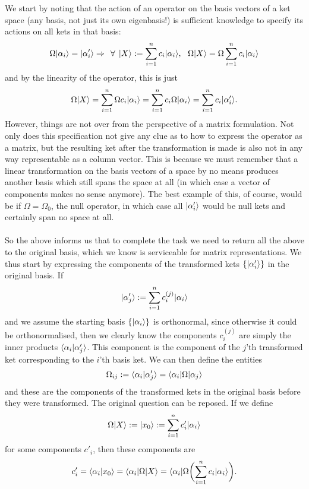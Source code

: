 \\\\
We start by noting that the action of an operator on the basis vectors of a ket space (any basis, not just its own eigenbasis!) is sufficient knowledge to specify its actions on all kets in that basis:
$$
\Omega|\alpha_{i}\rangle=|\alpha'_{i}\rangle\Rightarrow\:\: \forall \:\:|X\rangle:=\sum_{i=1}^{n}c_{i}|\alpha_{i}\rangle, \:\:\: \Omega|X\rangle=\Omega\sum_{i=1}^{n}c_{i}|\alpha_{i}\rangle
$$
and by the linearity of the operator, this is just 
$$
\Omega|X\rangle=\sum_{i=1}^{n}\Omega c_{i}|\alpha_{i}\rangle=\sum_{i=1}^{n} c_{i}\Omega|\alpha_{i}\rangle=\sum_{i=1}^{n}c_{i}|\alpha'_{i}\rangle.
$$
However, things are not over from the perspective of a matrix formulation. Not only does this specification not give any clue as to how to express the operator as a matrix, but the resulting ket after the transformation is made is also not in any way representable as a column vector. This is because we must remember that a linear transformation on the basis vectors of a space by no means produces another basis which still spans the space at all (in which case a vector of components makes no sense anymore). The best example of this, of course, would be if $\Omega=\Omega_{0}$, the null operator, in which case all $|\alpha'_{i}\rangle$ would be null kets and certainly span no space at all.
\\\\
So the above informs us that to complete the task we need to return all the above to the original basis, which we know is serviceable for matrix representations. We thus start by expressing the components of the transformed kets $\{|\alpha'_{i}\rangle\}$ in the original basis. If
$$
|\alpha'_{j}\rangle:=\sum_{i=1}^{n}c^{(j)}_{i}|\alpha_{i}\rangle
$$
and we assume the starting basis $\{|\alpha_{i}\rangle\}$ is orthonormal, since otherwise it could be orthonormalised, then we clearly know the components $c_{i}^{(j)}$ are simply the inner products $\langle\alpha_{i}|\alpha'_{j}\rangle$. This component is the component of the $j$'th transformed ket corresponding to the $i$'th basis ket. We can then define the entities
$$
\Omega_{ij}:=\langle\alpha_{i}|\alpha'_{j}\rangle=\langle\alpha_{i}|{\Omega}|\alpha_{j}\rangle
$$
and these are the components of the transformed kets in the original basis before they were transformed. The original question can be reposed. If we define 
$$
\Omega|X\rangle:=|x_{0}\rangle:=\sum_{i=1}^{n}c'_{i}|\alpha_{i}\rangle
$$
for some components $c'_{i}$, then these components are
$$
c'_{i}=\langle\alpha_{i}|x_{0}\rangle=\langle\alpha_{i}|\Omega|X\rangle=\langle\alpha_{i}|\Omega\biggl(\sum_{i=1}^{n}c_{i}|\alpha_{i}\rangle\biggr).
$$
